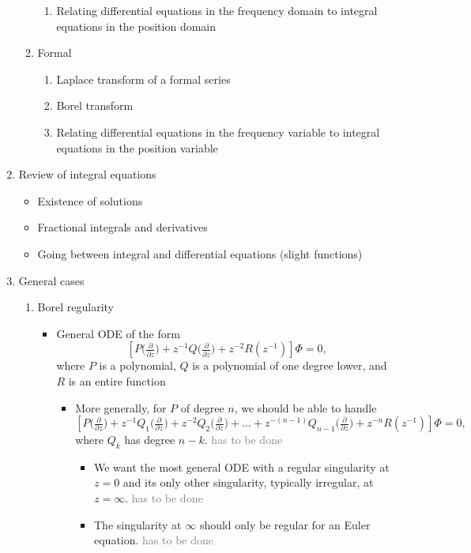 \documentclass{article}
\begin{document}
\begin{enumerate}
\begin{enumerate}
\begin{enumerate}
\item Relating differential equations in the frequency domain to integral equations in the position domain
\end{enumerate}
\item Formal
\begin{enumerate}
\item Laplace transform of a formal series
\item Borel transform
\item Relating differential equations in the frequency variable to integral equations in the position variable
\end{enumerate}
\end{enumerate}
\item Review of integral equations
\begin{itemize}
\item Existence of solutions
\item Fractional integrals and derivatives
\item Going between integral and differential equations (slight functions)
\end{itemize}
\item General cases
\begin{enumerate}
\item Borel regularity
\begin{itemize}
\item General ODE of the form
\[ \left[ P\big(\tfrac{\partial}{\partial z}\big) + z^{-1} Q\big(\tfrac{\partial}{\partial z}\big) + z^{-2} R(z^{-1}) \right] \Phi = 0, \]
where $P$ is a polynomial, $Q$ is a polynomial of one degree lower, and $R$ is an entire function~
\begin{itemize}
\color{DarkCyan}
\item More generally, for $P$ of degree $n$, we should be able to handle
\[ \left[ P\big(\tfrac{\partial}{\partial z}\big) + z^{-1} Q_1\big(\tfrac{\partial}{\partial z}\big) + z^{-2} Q_2\big(\tfrac{\partial}{\partial z}\big) + \ldots + z^{-(n-1)} Q_{n-1}\big(\tfrac{\partial}{\partial z}\big) + z^{-n} R(z^{-1}) \right] \Phi = 0, \]
where $Q_k$ has degree $n-k$. \textcolor{gray}{has to be done}
\begin{itemize}
\item We want the most general ODE with a regular singularity at $z = 0$ and its only other singularity, typically irregular, at $z = \infty$. \textcolor{gray}{has to be done}
\item The singularity at $\infty$ should only be regular for an Euler equation. \textcolor{gray}{has to be done}

\end{itemize}
\end{itemize}
\end{itemize}
\end{enumerate}
\end{enumerate}
\end{document}

